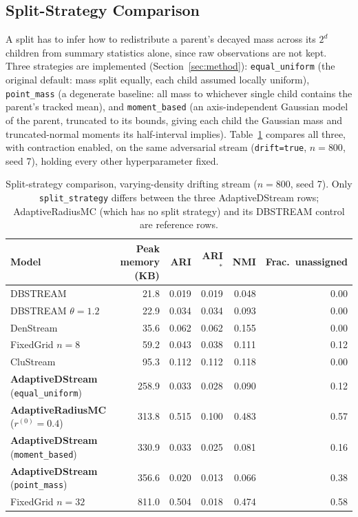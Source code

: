 \documentclass[11pt]{article}
\begin{document}
\subsection{Split-Strategy Comparison}
\label{sec:split-strategy}

A split has to infer how to redistribute a parent's decayed mass across its $2^d$ children from summary statistics alone, since raw observations are not kept. Three strategies are implemented (Section~\ref{sec:method}): \texttt{equal\_uniform} (the original default: mass split equally, each child assumed locally uniform), \texttt{point\_mass} (a degenerate baseline: all mass to whichever single child contains the parent's tracked mean), and \texttt{moment\_based} (an axis-independent Gaussian model of the parent, truncated to its bounds, giving each child the Gaussian mass and truncated-normal moments its half-interval implies). Table~\ref{tab:splitstrategy} compares all three, with contraction enabled, on the same adversarial stream (\texttt{drift=true}, $n=800$, seed 7), holding every other hyperparameter fixed.

\begin{table}[h]
\centering
\caption{Split-strategy comparison, varying-density drifting stream ($n=800$, seed 7). Only \texttt{split\_strategy} differs between the three AdaptiveDStream rows; AdaptiveRadiusMC (which has no split strategy) and its DBSTREAM control are reference rows.}
\label{tab:splitstrategy}
\begin{tabular}{lrrrrr}
\toprule
Model & Peak memory (KB) & ARI & ARI$^*$ & NMI & Frac.\ unassigned \\
\midrule
DBSTREAM & 21.8 & 0.019 & 0.019 & 0.048 & 0.00 \\
DBSTREAM $\theta{=}1.2$ & 22.9 & 0.034 & 0.034 & 0.093 & 0.00 \\
DenStream & 35.6 & 0.062 & 0.062 & 0.155 & 0.00 \\
FixedGrid $n{=}8$ & 59.2 & 0.043 & 0.038 & 0.111 & 0.12 \\
CluStream & 95.3 & 0.112 & 0.112 & 0.118 & 0.00 \\
\textbf{AdaptiveDStream} (\texttt{equal\_uniform}) & 258.9 & 0.033 & 0.028 & 0.090 & 0.12 \\
\textbf{AdaptiveRadiusMC} ($r^{(0)}{=}0.4$) & 313.8 & 0.515 & 0.100 & 0.483 & 0.57 \\
\textbf{AdaptiveDStream} (\texttt{moment\_based}) & 330.9 & 0.033 & 0.025 & 0.081 & 0.16 \\
\textbf{AdaptiveDStream} (\texttt{point\_mass}) & 356.6 & 0.020 & 0.013 & 0.066 & 0.38 \\
FixedGrid $n{=}32$ & 811.0 & 0.504 & 0.018 & 0.474 & 0.58 \\
\bottomrule
\end{tabular}
\end{table}
\end{document}
